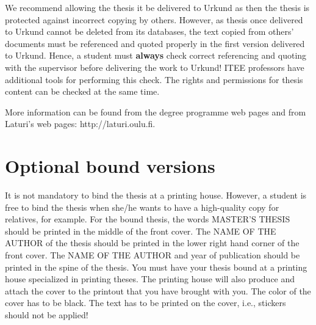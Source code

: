 We recommend allowing the thesis it be delivered to Urkund as then the thesis is protected against incorrect copying by others. However, as thesis once delivered to Urkund cannot be deleted from its databases, the text copied from others’ documents must be referenced and quoted properly in the first version delivered to Urkund. Hence, a student must \textbf{always} check correct referencing and quoting with the supervisor before delivering the work to Urkund! ITEE professors have additional tools for performing this check. The rights and permissions for thesis content can be checked at the same time.

More information can be found from the degree programme web pages \cite{mscstudies} and from Laturi’s web pages: http://laturi.oulu.fi.


\section{Optional bound versions}

It is not mandatory to bind the thesis at a printing house. However, a student is free to bind the thesis when she/he wants to have a high-quality copy for relatives, for example. For the bound thesis, the words MASTER’S THESIS should be printed in the middle of the front cover. The NAME OF THE AUTHOR of the thesis should be printed in the lower right hand corner of the front cover. The NAME OF THE AUTHOR and year of publication should be printed in the spine of the thesis. You must have your thesis bound at a printing house specialized in printing theses. The printing house will also produce and attach the cover to the printout that you have brought with you. The color of the cover has to be black. The text has to be printed on the cover, i.e., stickers should not be applied!
